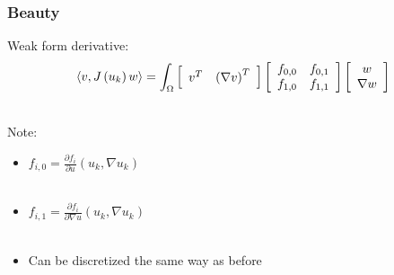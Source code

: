 \documentclass{beamer}
\begin{document}
\begin{frame}
\begin{center}
\frametitle{Beauty}

Weak form derivative:\\

\begin{equation*}
\langle v, J \left( u_k \right) w \rangle = \int_{\Omega}
\left[ \begin{array}{c c}
v^T & \left( \nabla v \right)^T
\end{array} \right]
\left[ \begin{array}{c c}
f_{0, 0} & f_{0, 1}\\
f_{1, 0} & f_{1, 1}
\end{array} \right]
\left[ \begin{array}{c}
w \\ \nabla w
\end{array} \right]
\label{eq:jacobian_form}
\end{equation*}

~\\

Note:

\begin{itemize}

\item $f_{i, 0} = \frac{\partial f_i}{\partial u} \left( u_k, \nabla u_k \right)$\\

~\\

\item $f_{i, 1} = \frac{\partial f_i}{\partial \nabla u} \left( u_k, \nabla u_k \right)$\\

~\\

\item Can be discretized the same way as before

\end{itemize}

\end{center}
\end{frame}

\end{document}
